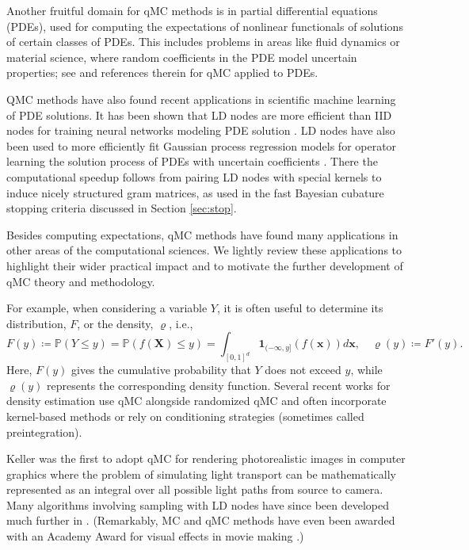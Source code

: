 \documentclass{svproc}
\newcounter{algorithm}%
\begin{document}
Another fruitful domain for qMC methods is in partial differential equations (PDEs), used for computing the expectations of nonlinear functionals of solutions of certain classes of PDEs. This includes problems in areas like fluid dynamics or material science, where random coefficients in the PDE model uncertain properties; see \cite{KuoNuy16a,KuoEtal12a,GraEtal11a} and references therein for qMC applied to PDEs.

QMC methods have also found recent applications in scientific machine learning of PDE solutions. It has been shown that LD nodes are more efficient than IID nodes for training neural networks modeling PDE solution \cite{longo21,mishra21}. LD nodes have also been used to more efficiently fit Gaussian process regression models for operator learning the solution process of PDEs with uncertain coefficients  \cite{sorokin2024computationally}. There the computational speedup follows from pairing LD nodes with special kernels to induce nicely structured gram matrices, as used in the fast Bayesian cubature stopping criteria discussed in Section \ref{sec:stop}. 

Besides computing expectations, qMC methods have found many applications in other areas of the computational sciences. We lightly review these applications to highlight their wider practical impact and to motivate the further development of qMC theory and methodology.

For example, when considering a variable $Y$, it is often useful to determine its distribution, $F$, or the density, $\varrho$, i.e., 
\[
F(y) \coloneqq \mathbb{P}(Y\leq y)=\mathbb{P}(f(\mathbf{X})\leq y)=\int_{[0,1]^d} \mathbf{1}_{(-\infty,y]}(f(\mathbf{x}))d\mathbf{x}, \quad \varrho(y)\coloneqq F'(y).
\]
Here, $F(y)$ gives the cumulative probability that $Y$ does not exceed $y$, while $\varrho(y)$ represents the corresponding density function. Several recent works for density estimation use qMC \cite{LEcPuc20a,LEcuyer2022b,GilKuoSlo23a} alongside randomized qMC \cite{AbdEtal21a} and often incorporate kernel-based methods or rely on conditioning strategies (sometimes called preintegration).

Keller \cite{kell95} was the first to adopt qMC for rendering photorealistic images in computer graphics where the problem of simulating light transport can be mathematically represented as an integral over all possible light paths from source to camera. Many algorithms involving sampling with LD nodes have since been developed much further in \cite{kellprem12,shired08,Keller2013a,kolkel00,kell96,kell95}. (Remarkably, MC and qMC methods have even been awarded with an Academy Award for visual effects in movie making \cite{veachthesis,oscars}.)
\end{document}
